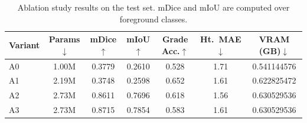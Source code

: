 \begin{table}[htbp]
\centering
\caption{Ablation study results on the test set. mDice and mIoU are computed over foreground classes.}
\label{tab:ablation}
\begin{tabular}{lcccccc}
\toprule
Variant & Params$\downarrow$ & mDice$\uparrow$ & mIoU$\uparrow$ & Grade Acc.$\uparrow$ & Ht.~MAE$\downarrow$ & VRAM (GB)$\downarrow$ \\
\midrule
A0 & 1.00M & 0.3779 & 0.2610 & 0.528 & 1.71 & 0.541144576 \\
A1 & 2.19M & 0.3748 & 0.2598 & 0.652 & 1.61 & 0.622825472 \\
A2 & 2.73M & 0.8611 & 0.7696 & 0.618 & 1.56 & 0.630529536 \\
A3 & 2.73M & 0.8715 & 0.7854 & 0.583 & 1.61 & 0.630529536 \\
\bottomrule
\end{tabular}
\end{table}